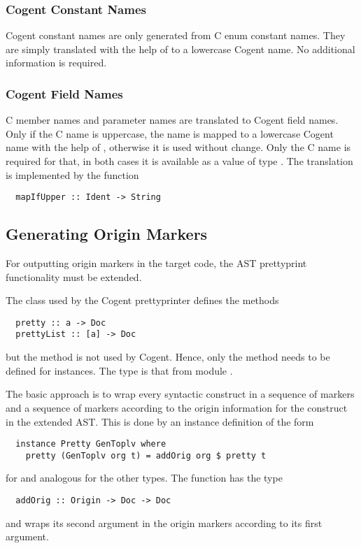 \subsubsection{Cogent Constant Names}

Cogent constant names are only generated from C enum constant names. They are simply translated
with the help of  to a lowercase Cogent name. No additional information is required.

\subsubsection{Cogent Field Names}

C member names and parameter names are translated to Cogent field names. Only if the C name is
uppercase, the name is mapped to a lowercase Cogent name with the help of , 
otherwise it is used without change. Only the C name is required for that, in both cases it is
available as a value of type . The translation is implemented by the function
\begin{verbatim}
  mapIfUpper :: Ident -> String
\end{verbatim}

\subsection{Generating Origin Markers}
\label{impl-ccode-origin}

For outputting origin markers in the target code, the AST prettyprint functionality must be extended.

The class  used by the Cogent prettyprinter defines the methods
\begin{verbatim}
  pretty :: a -> Doc
  prettyList :: [a] -> Doc
\end{verbatim}
but the method  is not used by Cogent. Hence, only the method  needs to be defined
for instances. The type  is that from module .

The basic approach is to wrap every syntactic construct in a sequence of  markers and 
a sequence of  markers according to the origin information for the construct in the extended AST. 
This is done by an instance definition of the form
\begin{verbatim}
  instance Pretty GenToplv where
    pretty (GenToplv org t) = addOrig org $ pretty t
\end{verbatim}
for  and analogous for the other types. The function  has the type
\begin{verbatim}
  addOrig :: Origin -> Doc -> Doc
\end{verbatim}
and wraps its second argument in the origin markers according to its first argument.

